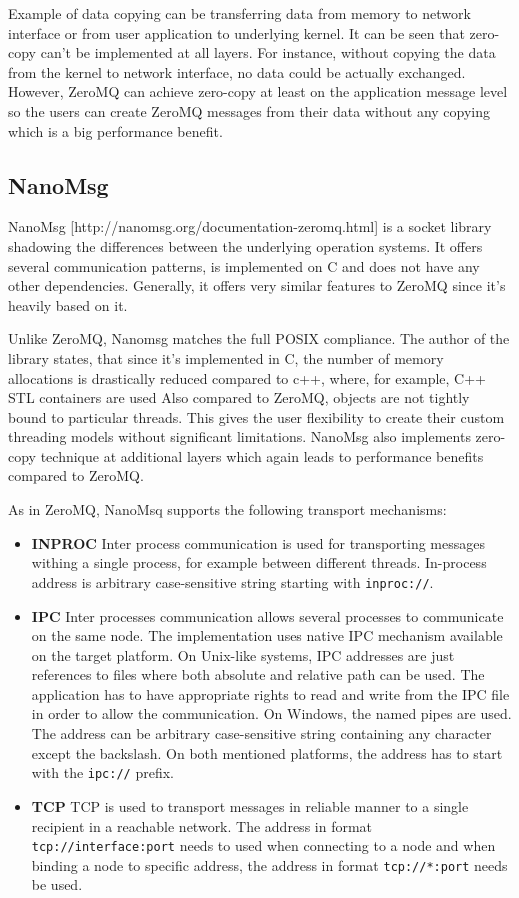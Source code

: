 Example of data copying can be transferring data from memory to network interface or from user application to underlying kernel.  It  can be seen that zero-copy can't be implemented at all layers. For instance,  without copying the data from the kernel to network interface, no data could be actually exchanged. However, ZeroMQ can achieve zero-copy at least on the application message level so the users can create ZeroMQ messages from their data without any copying which is a big performance benefit.
\subsection{NanoMsg}
\label{sec:nanomsg}
NanoMsg [http://nanomsg.org/documentation-zeromq.html] is a socket library shadowing the differences between the underlying operation systems. It offers several communication patterns, is implemented on C and does not have any other dependencies. Generally, it offers very similar features to ZeroMQ since it's heavily based on it.

Unlike ZeroMQ, Nanomsg matches the full POSIX compliance. The author of the library states, that since it's implemented in C, the number of memory allocations is drastically reduced compared to c++, where, for example, C++ STL containers are used  Also compared to ZeroMQ, objects are not tightly bound to particular threads. This gives the user flexibility to create their custom threading models without significant limitations. NanoMsg also implements zero-copy technique at additional layers which again leads to performance benefits compared to ZeroMQ.

As in ZeroMQ, NanoMsq supports the following transport mechanisms:
\begin{itemize}
	\item \textbf{INPROC} \newline
	Inter process communication is used for transporting messages withing a single process, for example between different threads. In-process address is arbitrary case-sensitive string starting with \texttt{inproc://}.
	\item \textbf{IPC}  \newline 
	Inter processes communication allows several processes to communicate on the same node. The implementation uses native IPC mechanism available on the target platform. On Unix-like systems, IPC addresses are just references to files where both absolute and relative path can be used. The application has to have appropriate rights to read and write from the IPC file in order to allow the communication. On Windows, the named pipes are used. The address can be arbitrary case-sensitive string containing any character except the backslash. On both mentioned platforms, the address has to start with the \texttt{ipc://} prefix.
	\item \textbf{TCP} \newline
	TCP is used to transport messages in reliable manner to a single recipient in a reachable network.  The address in format \texttt{tcp://interface:port} needs to used when connecting to a node and when binding a node to specific address, the address in format \texttt{tcp://*:port} needs be used.
\end{itemize}

